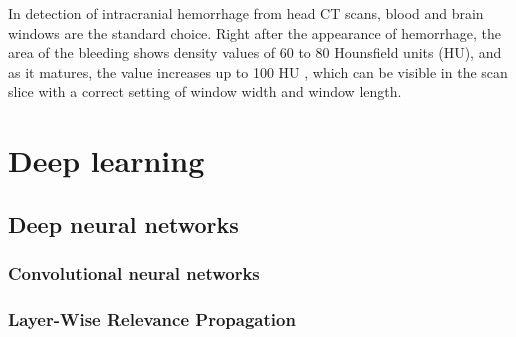 In detection of intracranial hemorrhage from head CT scans, blood and brain windows are the standard choice. Right after the appearance of hemorrhage, the area of the bleeding shows density values of 60 to 80 Hounsfield units (HU), and as it matures, the value increases up to 100 HU  \cite{principlesOfCT}, which can be visible in the scan slice with a correct setting of window width and window length.

\chapter{Deep learning}
\section{Deep neural networks}
\subsection{Convolutional neural networks}
\subsection{Layer-Wise Relevance Propagation}



